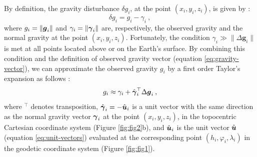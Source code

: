 \documentclass[extra]{gji}
\begin{document}
By definition, the gravity disturbance $\delta g_{i}$,
at the point $(x_{i}, y_{i}, z_{i})$, is given by 
\citep{heiskanen-moritz1967, hofmann-wellenhof-moritz2005}:
\begin{equation}
\delta g_{i} =  g_{i} - \gamma_{i} \: ,
\label{eq:gravity-disturbance}
\end{equation}
where $g_{i} = \| \mitbf{g}_{i} \|$ and 
$\gamma_{i} = \| \mitbf{\gamma}_{i} \|$ are,
respectively, the observed gravity and the normal gravity at the
point $(x_{i}, y_{i}, z_{i})$.
Fortunately, the condition 
$\gamma_{i} \gg \| \Delta \mathbf{g}_{i} \|$ 
is met at all points located above or on the Earth's surface.
By combining this condition and the definition of observed gravity vector
(equation \ref{eq:gravity-vector}), we can approximate the observed gravity
$g_{i}$ by a first order Taylor's expansion as follows 
\citep{sanso_sideris2013}:
\begin{equation}
g_{i} \approx \gamma_{i} + 
\hat{\mitbf{\gamma}}_{i}^{\top} \Delta \mitbf{g}_{i} \: ,
\label{eq:gobs-approx}
\end{equation}
where $^{\top}$ denotes transposition,
$\hat{\mitbf{\gamma}}_{i} = -\hat{\mitbf{u}}_{i}$ is a unit 
vector with the same direction as the normal gravity vector 
$\mitbf{\gamma}_{i}$ at the point $(x_{i}, y_{i}, z_{i})$, in the
topocentric Cartesian coordinate system (Figure \ref{fig:fig2}b), and
$\hat{\mitbf{u}}_{i}$ is the unit vector $\hat{\mitbf{u}}$ 
(equation \ref{eq:unit-vectors}) evaluated at the corresponding 
point $(h_{i}, \varphi_{i}, \lambda_{i})$ in the 
geodetic coordinate system (Figure \ref{fig:fig1}).
\end{document}
